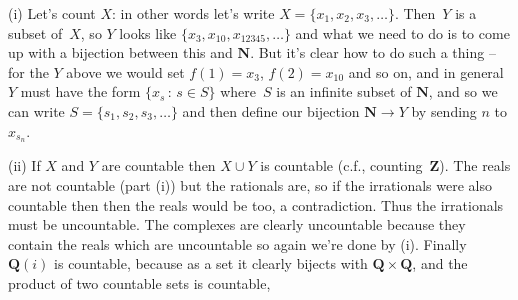 \documentclass[10pt]{article}
\newcommand{\N}{\mathbf{N}}
\newcommand{\Q}{\mathbf{Q}}
\newcommand{\Z}{\mathbf{Z}}
\begin{document}
\medskip{} 

(i) Let's count $X$: in other words let's write $X=\{x_1,x_2,x_3,\ldots\}$. Then~$Y$ is a subset of~$X$, so $Y$ looks like $\{x_3,x_{10},x_{12345},\ldots\}$ and what we need to do is to come up with a bijection between this and $\N$. But it's clear how to do such a thing -- for the $Y$ above we would set $f(1)=x_3$, $f(2)=x_{10}$ and so on, and in general $Y$ must have the form $\{x_s\,:\,s\in S\}$ where~$S$ is an infinite subset of $\N$, and so we can write $S=\{s_1,s_2,s_3,\ldots\}$ and then define our bijection $\N\to Y$ by sending $n$ to $x_{s_n}$.

(ii) If $X$ and $Y$ are countable then $X\cup Y$ is countable (c.f., counting~$\Z$). The reals are not countable (part (i)) but the rationals are, so if the irrationals were also countable then then the reals would be too, a contradiction.  Thus the irrationals must be uncountable. The complexes are clearly uncountable because they contain the reals which are uncountable so again we're done by (i). Finally $\Q(i)$ is countable, because as a set it clearly bijects with $\Q\times\Q$, and the product of two countable sets is countable,
\end{document}
